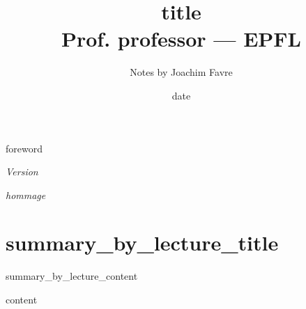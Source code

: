 \documentclass[a4paper]{book}
\title{{title}\\ Prof. {professor} --- EPFL}
\author{Notes {by} Joachim Favre}
\date{{date}}
\begin{document}
\maketitle

\clearemptydoublepage
\thispagestyle{empty}



\vspace*{\fill}
{foreword}
\vspace*{\fill}
\vspace*{\fill}
\begin{center}
\initcurrdate
\def\setdateformat{Y--m--d}
\textit{Version }
\end{center}
\vspace*{\fill}

\clearemptydoublepage


\thispagestyle{empty}
\vspace*{\fill}
\begin{flushright}
\begin{minipage}{7cm}
{\itshape 
{hommage}
}
\end{minipage}
\end{flushright}
\vspace*{\fill}
\vspace*{\fill}

\clearemptydoublepage


\tableofcontents

\cleardoublepage


\renewcommand{\cftchapleader}{\cftdotfill{\cftdotsep}}
\renewcommand*{\cftchapfont}{}

\listoflectures


\chapter{{summary_by_lecture_title}}

{summary_by_lecture_content}


\cleardoublepage

{content}


\clearemptydoublepage
\end{document}
